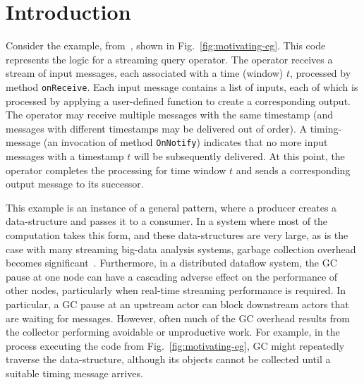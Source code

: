 \newcommand{\TODO}[1]{\textbf{TODO: #1}} \newcommand{\eg}{\emph{e.g.}}
\newcommand{\ie}{\emph{i.e.}}

\section{Introduction} \label{sec:introduction}

Consider the example, from~\cite{Broom:HotOS}, shown in
Fig.~\ref{fig:motivating-eg}.  This code represents the logic for a
streaming query operator.  The operator receives a stream of input
messages, each associated with a time (window) $t$, processed by
method \texttt{onReceive}.  Each input message contains a list of
inputs, each of which is processed by applying a user-defined function
to create a corresponding output.  The operator may receive multiple
messages with the same timestamp (and messages with different
timestamps may be delivered out of order).  A timing-message (an
invocation of method \texttt{OnNotify}) indicates that no more input
messages with a timestamp $t$ will be subsequently delivered.  At this
point, the operator completes the processing for time window $t$ and
sends a corresponding output message to its successor.



This example is an instance of a general pattern, where a producer
creates a data-structure and passes it to a consumer. In a system
where most of the computation takes this form, and these
data-structures are very large, as is the case with many streaming
big-data analysis systems, garbage collection overhead becomes
significant~\cite{Broom:HotOS}.
Furthermore, in a distributed dataflow system, the GC pause at one node can
have a cascading adverse effect on the performance of other nodes, particularly
when real-time streaming performance is required.
In particular, a GC pause at an upstream actor can block
downstream actors that are waiting for messages. 
However, often much of the GC overhead results from the collector performing avoidable or unproductive work.
For example, in the process executing the code from
Fig.~\ref{fig:motivating-eg}, GC might repeatedly traverse the 
data-structure, although its objects cannot be collected until a
suitable timing message arrives.


